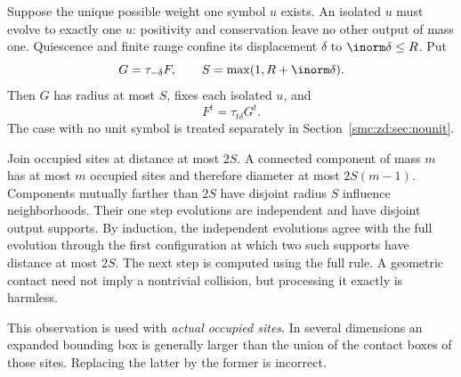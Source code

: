 \documentclass[11pt,letterpaper]{article}
\numberwithin{equation}{section}
\theoremstyle{definition}
\theoremstyle{remark}
\begin{document}
Suppose the unique possible weight one symbol $u$ exists. An isolated $u$ must evolve to exactly one $u$: positivity and conservation leave no other output of mass one. Quiescence and finite range confine its displacement $\delta$ to $\inorm\delta\le R$. Put
\[
 G=\tau_{-\delta}F,\qquad S=\max(1,R+\inorm\delta).
\]
Then $G$ has radius at most $S$, fixes each isolated $u$, and
\begin{equation}\label{smc:zd:eq:restore}
 F^t=\tau_{t\delta}G^t.
\end{equation}
The case with no unit symbol is treated separately in Section~\ref{smc:zd:sec:nounit}.

Join occupied sites at distance at most $2S$. A connected component of mass $m$ has at most $m$ occupied sites and therefore diameter at most $2S(m-1)$. Components mutually farther than $2S$ have disjoint radius $S$ influence neighborhoods. Their one step evolutions are independent and have disjoint output supports. By induction, the independent evolutions agree with the full evolution through the first configuration at which two such supports have distance at most $2S$. The next step is computed using the full rule. A geometric contact need not imply a nontrivial collision, but processing it exactly is harmless.

This observation is used with \emph{actual occupied sites}. In several dimensions an expanded bounding box is generally larger than the union of the contact boxes of those sites. Replacing the latter by the former is incorrect.
\end{document}
